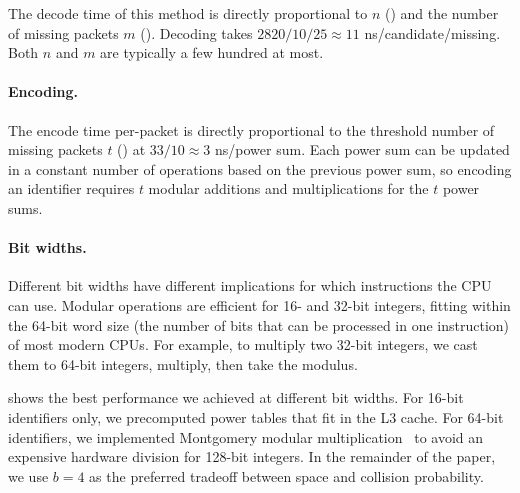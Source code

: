 The decode time of this method is directly proportional to $n$ ()
and the number of missing packets $m$ ().
Decoding takes $2820/10/25 \approx 11$ ns/candidate/missing.
Both $n$ and $m$ are typically a few hundred at most.




\paragraph{Encoding.} The encode time per-packet is directly proportional to
the threshold number of missing packets $t$ () at
$33/10 \approx 3$ ns/power sum.
Each power sum can be updated in a constant number of operations based on the
previous power sum, so encoding an identifier requires $t$ modular additions
and multiplications for the $t$ power sums.

\paragraph{Bit widths.} Different bit widths have different implications for
which instructions the CPU can use. Modular operations are efficient
for 16- and 32-bit integers, fitting within the 64-bit word size (the number of
bits that can be processed in one instruction) of most modern CPUs. For example,
to multiply two 32-bit integers, we cast them to 64-bit integers, multiply,
then take the modulus.

 shows the best performance we
achieved at different bit widths.
For 16-bit identifiers only, we precomputed power tables that fit in the L3 cache.
For 64-bit identifiers, we implemented Montgomery modular multiplication~\cite{montgomery1985modular}
to avoid an expensive hardware division for 128-bit integers.
In the remainder of the paper, we use $b=4$
as the preferred tradeoff between space and collision probability.

% 

% 

